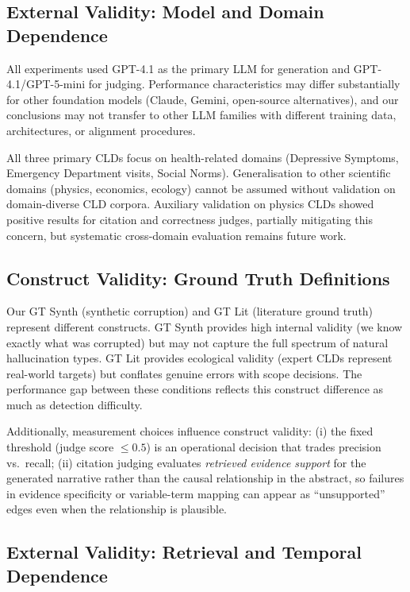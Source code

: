 \subsection{External Validity: Model and Domain Dependence}

All experiments used GPT-4.1 as the primary LLM for generation and GPT-4.1/GPT-5-mini for judging. Performance characteristics may differ substantially for other foundation models (Claude, Gemini, open-source alternatives), and our conclusions may not transfer to other LLM families with different training data, architectures, or alignment procedures.

All three primary CLDs focus on health-related domains (Depressive Symptoms, Emergency Department visits, Social Norms). Generalisation to other scientific domains (physics, economics, ecology) cannot be assumed without validation on domain-diverse CLD corpora. Auxiliary validation on physics CLDs showed positive results for citation and correctness judges, partially mitigating this concern, but systematic cross-domain evaluation remains future work.

\subsection{Construct Validity: Ground Truth Definitions}

Our GT Synth (synthetic corruption) and GT Lit (literature ground truth) represent different constructs. GT Synth provides high internal validity (we know exactly what was corrupted) but may not capture the full spectrum of natural hallucination types. GT Lit provides ecological validity (expert CLDs represent real-world targets) but conflates genuine errors with scope decisions. The performance gap between these conditions reflects this construct difference as much as detection difficulty.

Additionally, measurement choices influence construct validity: (i) the fixed threshold (judge score $\le 0.5$) is an operational decision that trades precision vs.\ recall; (ii) citation judging evaluates \textit{retrieved evidence support} for the generated narrative rather than the causal relationship in the abstract, so failures in evidence specificity or variable-term mapping can appear as ``unsupported'' edges even when the relationship is plausible.

\subsection{External Validity: Retrieval and Temporal Dependence}

